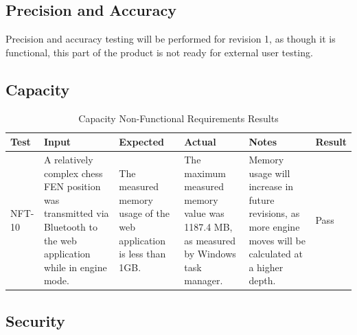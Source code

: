\documentclass[12pt, titlepage]{article}
\begin{document}
\subsection{Precision and Accuracy}

Precision and accuracy testing will be performed for revision 1, as though it is functional, this part of the product is not ready for external user testing.

\subsection{Capacity}

\begin{table}[H]
\centering
    \setlength{\leftmargini}{0cm}
    \begin{tabular}{| >{\centering\arraybackslash}m{1cm} | 
        >{\centering\arraybackslash}m{2.5cm} | 
        >{\centering\arraybackslash}m{4cm} | 
        >{\centering\arraybackslash}m{3cm} |
        >{\centering\arraybackslash}m{3cm} |
        >{\centering\arraybackslash}m{1.5cm} |}
    \hline
    \rowcolor[gray]{0.9}
    Test & Input & Expected & Actual & Notes & Result\\
    \hline
    NFT-10 & A relatively complex chess FEN position was transmitted via Bluetooth to the web application while in engine mode. & The measured memory usage of the web application is less than 1GB. & The maximum measured memory value was 1187.4 MB, as measured by Windows task manager. & Memory usage will increase in future revisions, as more engine moves will be calculated at a higher depth. & Pass \\
    \hline
    \end{tabular}
\caption{Capacity Non-Functional Requirements Results}
\end{table}

\subsection{Security}
\end{document}
